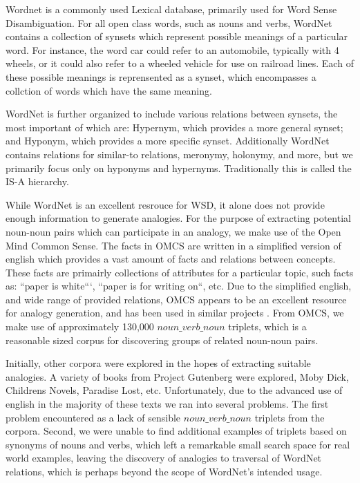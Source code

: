 \documentclass[11pt]{article}
\begin{document}
Wordnet \cite{fellbaum98wordnet} is a commonly used Lexical database, primarily used for Word Sense
Disambiguation.  For all open class words, such as nouns and verbs, WordNet
contains a collection of synsets which represent possible meanings of a
particular word.  For instance, the word car could refer to an automobile,
typically with 4 wheels, or it could also refer to a wheeled vehicle for use on
railroad lines.  Each of these possible meanings is reprensented as a synset,
which encompasses a collction of words which have the same meaning.

WordNet is further organized to include various relations between synsets, the
most important of which are: Hypernym, which provides a more general synset;
and Hyponym, which provides a more specific synset.  Additionally WordNet
contains relations for similar-to relations, meronymy, holonymy, and more, but
we primarily focus only on hyponyms and hypernyms.  Traditionally this is called
the IS-A hierarchy.

While WordNet is an excellent resrouce for WSD, it alone does not provide enough
information to generate analogies.  For the purpose of extracting potential
noun-noun pairs which can participate in an analogy, we make use of the Open
Mind Common Sense.  The facts in OMCS are written in a simplified version of
english which provides a vast amount of facts and relations between concepts.
These facts are primairly collections of attributes for a particular topic, such
facts as: ``paper is white```, ``paper is for writing on``, etc.  Due to the
simplified english, and wide range of provided relations, OMCS appears to be an
excellent resource for analogy generation, and has been used in similar projects
\cite{speer08analogyspace}.  From OMCS, we make use of approximately 130,000
$noun\_verb\_noun$ triplets, which is a reasonable sized corpus for discovering
groups of related noun-noun pairs.


Initially, other corpora were explored in the hopes of extracting suitable
analogies.  A variety of books from Project Gutenberg were explored, Moby Dick,
Childrens Novels, Paradise Lost, etc.  Unfortunately, due to the advanced use of
english in the majority of these texts we ran into several problems.  The first
problem encountered as a lack of sensible $noun\_verb\_noun$ triplets from the
corpora.  Second, we were unable to find additional examples of triplets based
on synonyms of nouns and verbs, which left a remarkable small search space for
real world examples, leaving the discovery of analogies to traversal of WordNet
relations, which is perhaps beyond the scope of WordNet's intended usage.
\end{document}

